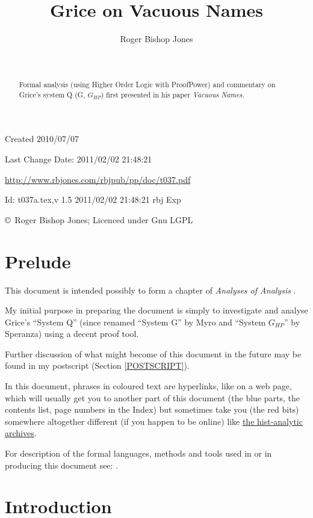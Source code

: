 \documentclass[11pt]{article}
\title{Grice on Vacuous Names}
\author{Roger Bishop Jones}
\date{\ }
\begin{document}
\begin{titlepage}
\maketitle
\begin{abstract}
Formal analysis (using Higher Order Logic with ProofPower) and commentary on Grice's system Q (G, $G_{HP}$) first presented in his paper \emph{Vacuous Names}.
\end{abstract}
\vfill

\begin{centering}
{\footnotesize

Created 2010/07/07

Last Change $ $Date: 2011/02/02 21:48:21 $ $

\href{http://www.rbjones.com/rbjpub/pp/doc/t037.pdf}
{http://www.rbjones.com/rbjpub/pp/doc/t037.pdf}

$ $Id: t037a.tex,v 1.5 2011/02/02 21:48:21 rbj Exp $ $

\copyright\ Roger Bishop Jones; Licenced under Gnu LGPL

}%
\end{centering}

\thispagestyle{empty}
\end{titlepage}

\newpage
\addtocounter{page}{1}
{\parskip=0pt\tableofcontents}

\section{Prelude}

This document is intended possibly to form a chapter of {\it Analyses of Analysis} \cite{rbjb003}.

My initial purpose in preparing the document is simply to investigate and analyse Grice's ``System Q'' (since renamed ``System G'' by Myro and ``System $G_{HP}$'' by Speranza) using a decent proof tool.

Further discussion of what might become of this document in the future may be found in my postscript (Section \ref{POSTSCRIPT}).

In this document, phrases in coloured text are hyperlinks, like on a web page, which will usually get you to another part of this document (the blue parts, the contents list, page numbers in the Index) but sometimes take you (the red bits) somewhere altogether different (if you happen to be online) like \href{http://rbjones.com/pipermail/hist-analytic_rbjones.com}{the hist-analytic archives}.

For description of the formal languages, methods and tools used in or in producing this document see: \cite{rbjt029}.

\section{Introduction}
\end{document}
